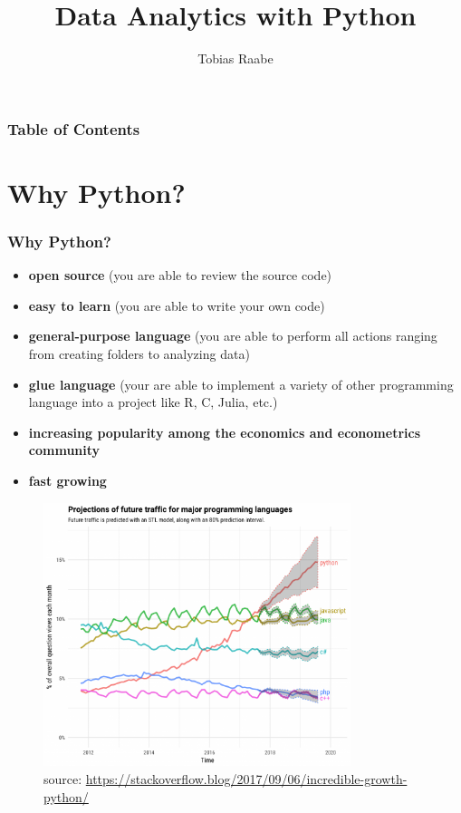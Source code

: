 


\title{Data Analytics with Python}
\author{Tobias Raabe}
\date{}
\let\otp\titlepage


\maketitle

\begin{frame}[c]\frametitle{Table of Contents}
\tableofcontents
\end{frame}

\section{Why Python?} %
\label{sec:why_python}

\begin{frame}[c]\frametitle{Why Python?}
\begin{itemize}
    \item \textbf{open source} (you are able to review the source code)
    \item \textbf{easy to learn} (you are able to write your own code)
    \item \textbf{general-purpose language} (you are able to perform all actions ranging from creating folders to analyzing data)
    \item \textbf{glue language} (your are able to implement a variety of other programming language into a project like R, C, Julia, etc.)
    \item \textbf{increasing popularity among the economics and econometrics community}
    \item \textbf{fast growing}
\end{itemize}
\end{frame}

\begin{frame}[c]
\begin{figure}[tb]
    \centering
    \includegraphics[width=0.8\textwidth, height=0.8\textheight]{material/fig-python-growth}
    \caption{source: \url{https://stackoverflow.blog/2017/09/06/incredible-growth-python/}}
    \label{fig:python-growth}
\end{figure}
\end{frame}

